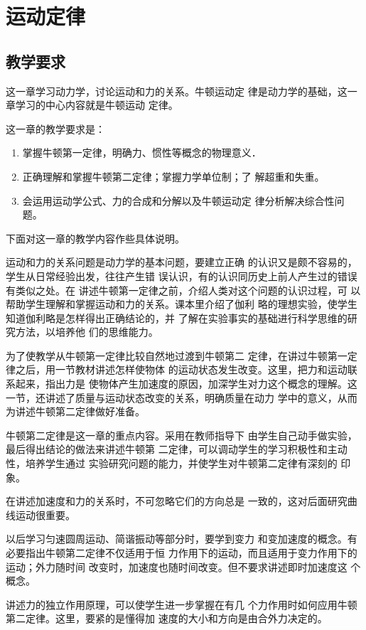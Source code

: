 
\chapter{运动定律}\minitoc[n]
\section{教学要求}
这一章学习动力学，讨论运动和力的关系。牛顿运动定
律是动力学的基础，这一章学习的中心内容就是牛顿运动
定律。

这一章的教学要求是：
\begin{enumerate}

\item 掌握牛顿第一定律，明确力、惯性等概念的物理意义．
\item 正确理解和掌握牛顿第二定律；掌握力学单位制；了
解超重和失重。
\item 会运用运动学公式、力的合成和分解以及牛顿运动定
律分析解决综合性问题。
\end{enumerate}

下面对这一章的教学内容作些具体说明。

运动和力的关系问题是动力学的基本问题，要建立正确
的认识又是颇不容易的，学生从日常经验出发，往往产生错
误认识，有的认识同历史上前人产生过的错误有类似之处。在
讲述牛顿第一定律之前，介绍人类对这个问题的认识过程，可
以帮助学生理解和掌握运动和力的关系。课本里介绍了伽利
略的理想实验，使学生知道伽利略是怎样得出正确结论的，并
了解在实验事实的基础进行科学思维的研究方法，以培养他
们的思维能力。

为了使教学从牛顿第一定律比较自然地过渡到牛顿第二
定律，在讲过牛顿第一定律之后，用一节教材讲述怎样使物体
的运动状态发生改变。这里，把力和运动联系起来，指出力是
使物体产生加速度的原因，加深学生对力这个概念的理解。这
一节，还讲述了质量与运动状态改变的关系，明确质量在动力
学中的意义，从而为讲述牛顿第二定律做好准备。

牛顿第二定律是这一章的重点内容。采用在教师指导下
由学生自己动手做实验，最后得出结论的做法来讲述牛顿第
二定律，可以调动学生的学习积极性和主动性，培养学生通过
实验研究问题的能力，并使学生对牛顿第二定律有深刻的
印象。

在讲述加速度和力的关系时，不可忽略它们的方向总是
一致的，这对后面研究曲线运动很重要。

以后学习匀速圆周运动、简谐振动等部分时，要学到变力
和变加速度的概念。有必要指出牛顿第二定律不仅适用于恒
力作用下的运动，而且适用于变力作用下的运动；外力随时间
改变时，加速度也随时间改变。但不要求讲述即时加速度这
个概念。

讲述力的独立作用原理，可以使学生进一步掌握在有几
个力作用时如何应用牛顿第二定律。这里，要紧的是懂得加
速度的大小和方向是由合外力决定的。


